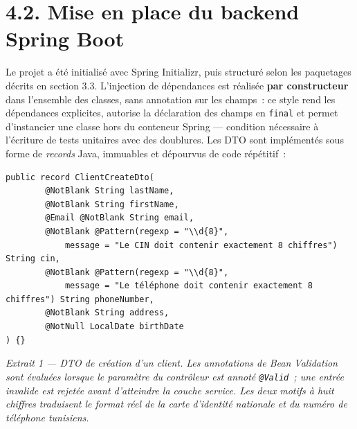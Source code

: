 \documentclass[12pt,a4paper]{report}
\begin{document}
\section*{4.2. Mise en place du backend Spring Boot}
Le projet a été initialisé avec Spring Initializr, puis structuré selon les paquetages décrits en section 3.3. L'injection de dépendances est réalisée \textbf{par constructeur} dans l'ensemble des classes, sans annotation sur les champs~: ce style rend les dépendances explicites, autorise la déclaration des champs en \texttt{final} et permet d'instancier une classe hors du conteneur Spring — condition nécessaire à l'écriture de tests unitaires avec des doublures. Les DTO sont implémentés sous forme de \textit{records} Java, immuables et dépourvus de code répétitif~:
\begin{verbatim}
public record ClientCreateDto(
        @NotBlank String lastName,
        @NotBlank String firstName,
        @Email @NotBlank String email,
        @NotBlank @Pattern(regexp = "\\d{8}",
            message = "Le CIN doit contenir exactement 8 chiffres") String cin,
        @NotBlank @Pattern(regexp = "\\d{8}",
            message = "Le téléphone doit contenir exactement 8 chiffres") String phoneNumber,
        @NotBlank String address,
        @NotNull LocalDate birthDate
) {}
\end{verbatim}
\begin{center}\textit{Extrait 1 — DTO de création d'un client. Les annotations de Bean Validation sont évaluées lorsque le paramètre du contrôleur est annoté \texttt{@Valid}~; une entrée invalide est rejetée avant d'atteindre la couche service. Les deux motifs à huit chiffres traduisent le format réel de la carte d'identité nationale et du numéro de téléphone tunisiens.}\end{center}
\end{document}
